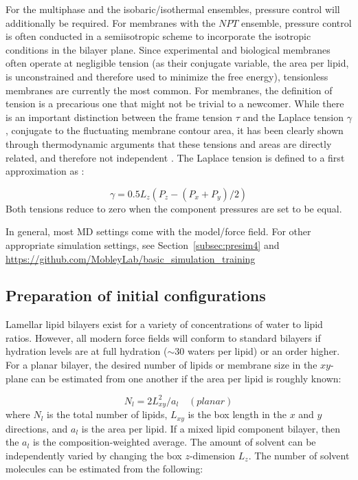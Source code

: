 \documentclass[9pt,bestpractices]{livecoms}
\begin{document}
For the multiphase and the isobaric/isothermal ensembles, pressure control will additionally be required.
For membranes with the $NPT$ ensemble, pressure control is often conducted in a semiisotropic scheme to incorporate the isotropic conditions in the bilayer plane.
Since experimental and biological membranes often operate at negligible tension (as their conjugate variable, the area per lipid, is unconstrained and therefore used to minimize the free energy), tensionless membranes are currently the most common.
For membranes, the definition of tension is a precarious one that might not be trivial to a newcomer.
While there is an important distinction between the frame tension $\tau$ and the Laplace tension $\gamma$, conjugate to the fluctuating membrane contour area, it has been clearly shown through thermodynamic arguments that these tensions and areas are directly related, and therefore not independent \cite{Diamant2011}.
The Laplace tension is defined to a first approximation as \cite{Kirkwood1949}:

\begin{equation}\label{eq:1}
	\gamma =0.5 L_z(P_z-(P_x+P_y)/2)
\end{equation}
Both tensions reduce to zero when the component pressures are set to be equal.

In general, most MD settings come with the model/force field. For other appropriate simulation settings, see Section~\ref{subsec:presim4} and \url{https://github.com/MobleyLab/basic_simulation_training}

\subsection{Preparation of initial configurations}
\label{prepconf3}
Lamellar lipid bilayers exist for a variety of concentrations of water to lipid ratios.
However, all modern force fields will conform to standard bilayers if hydration levels are at full hydration ($\sim$30 waters per lipid) or an order higher.
For a planar bilayer, the desired number of lipids or membrane size in the $xy$-plane can be estimated from one another if the area per lipid is roughly known:

\begin{equation}\label{eq:2}
	N_l = 2 L_{xy}^2/a_l \quad (planar)
\end{equation}
where $N_l$ is the total number of lipids, $L_{xy}$ is the box length in the $x$ and $y$ directions, and $a_l$ is the area per lipid.
If a mixed lipid component bilayer, then the $a_l$ is the composition-weighted average.
The amount of solvent can be independently varied by changing the box $z$-dimension $L_z$. The number of solvent molecules can be estimated from the following:
\end{document}
